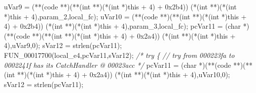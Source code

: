 \documentclass[
]{article}
\newenvironment{Shaded}{}{}
\newcommand{\BaseNTok}[1]{\textcolor[rgb]{0.25,0.63,0.44}{#1}}
\newcommand{\CommentTok}[1]{\textcolor[rgb]{0.38,0.63,0.69}{\textit{#1}}}
\newcommand{\DataTypeTok}[1]{\textcolor[rgb]{0.56,0.13,0.00}{#1}}
\newcommand{\DecValTok}[1]{\textcolor[rgb]{0.25,0.63,0.44}{#1}}
\newcommand{\NormalTok}[1]{#1}
\newcommand{\OperatorTok}[1]{\textcolor[rgb]{0.40,0.40,0.40}{#1}}
\begin{document}
\begin{Shaded}
\begin{Highlighting}[]
\NormalTok{      uVar9 }\OperatorTok{=} \OperatorTok{(**(}\NormalTok{code }\OperatorTok{**)(**(}\DataTypeTok{int} \OperatorTok{**)(*(}\DataTypeTok{int} \OperatorTok{*)}\NormalTok{this }\OperatorTok{+} \DecValTok{4}\OperatorTok{)} \OperatorTok{+} \BaseNTok{0x2b4}\OperatorTok{))}
                        \OperatorTok{(*(}\DataTypeTok{int} \OperatorTok{**)(*(}\DataTypeTok{int} \OperatorTok{*)}\NormalTok{this }\OperatorTok{+} \DecValTok{4}\OperatorTok{),}\NormalTok{param\_2}\OperatorTok{,}\NormalTok{local\_fc}\OperatorTok{);}
\NormalTok{      uVar10 }\OperatorTok{=} \OperatorTok{(**(}\NormalTok{code }\OperatorTok{**)(**(}\DataTypeTok{int} \OperatorTok{**)(*(}\DataTypeTok{int} \OperatorTok{*)}\NormalTok{this }\OperatorTok{+} \DecValTok{4}\OperatorTok{)} \OperatorTok{+} \BaseNTok{0x2b4}\OperatorTok{))}
                         \OperatorTok{(*(}\DataTypeTok{int} \OperatorTok{**)(*(}\DataTypeTok{int} \OperatorTok{*)}\NormalTok{this }\OperatorTok{+} \DecValTok{4}\OperatorTok{),}\NormalTok{param\_3}\OperatorTok{,}\NormalTok{local\_fc}\OperatorTok{);}
\NormalTok{      pcVar11 }\OperatorTok{=} \OperatorTok{(}\DataTypeTok{char} \OperatorTok{*)(**(}\NormalTok{code }\OperatorTok{**)(**(}\DataTypeTok{int} \OperatorTok{**)(*(}\DataTypeTok{int} \OperatorTok{*)}\NormalTok{this }\OperatorTok{+} \DecValTok{4}\OperatorTok{)} \OperatorTok{+} \BaseNTok{0x2a4}\OperatorTok{))}
                                  \OperatorTok{(*(}\DataTypeTok{int} \OperatorTok{**)(*(}\DataTypeTok{int} \OperatorTok{*)}\NormalTok{this }\OperatorTok{+} \DecValTok{4}\OperatorTok{),}\NormalTok{uVar9}\OperatorTok{,}\DecValTok{0}\OperatorTok{);}
\NormalTok{      sVar12 }\OperatorTok{=}\NormalTok{ strlen}\OperatorTok{(}\NormalTok{pcVar11}\OperatorTok{);}
\NormalTok{      FUN\_00017700}\OperatorTok{(}\NormalTok{local\_e4}\OperatorTok{,}\NormalTok{pcVar11}\OperatorTok{,}\NormalTok{sVar12}\OperatorTok{);}
                    \CommentTok{/* try \{ // try from 000223fa to 0002241f has its CatchHandler @ 00023acc */}
\NormalTok{      pcVar11 }\OperatorTok{=} \OperatorTok{(}\DataTypeTok{char} \OperatorTok{*)(**(}\NormalTok{code }\OperatorTok{**)(**(}\DataTypeTok{int} \OperatorTok{**)(*(}\DataTypeTok{int} \OperatorTok{*)}\NormalTok{this }\OperatorTok{+} \DecValTok{4}\OperatorTok{)} \OperatorTok{+} \BaseNTok{0x2a4}\OperatorTok{))}
                                  \OperatorTok{(*(}\DataTypeTok{int} \OperatorTok{**)(*(}\DataTypeTok{int} \OperatorTok{*)}\NormalTok{this }\OperatorTok{+} \DecValTok{4}\OperatorTok{),}\NormalTok{uVar10}\OperatorTok{,}\DecValTok{0}\OperatorTok{);}
\NormalTok{      sVar12 }\OperatorTok{=}\NormalTok{ strlen}\OperatorTok{(}\NormalTok{pcVar11}\OperatorTok{);}

\end{Highlighting}
\end{Shaded}
\end{document}
